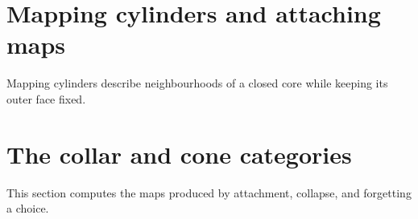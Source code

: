 \documentclass[11pt,a4paper]{article}
\theoremstyle{definition}
\begin{document}


















































\section{Mapping cylinders and attaching maps}
Mapping cylinders describe neighbourhoods of a closed core while
keeping its outer face fixed.







\section{The collar and cone categories}
This section computes the maps produced by attachment, collapse, and forgetting a choice.
\end{document}
